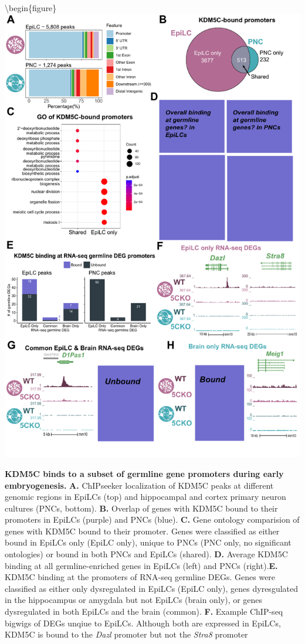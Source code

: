 \documentclass[
]{article}
\begin{document}
\textbackslash begin\{figure\} \centering 
\includegraphics{../submission/compiled_figs/KDM5C_ChIPseq.pdf}

\caption[KDM5C binds to a subset of germline gene promoters during early embryogenesis]{\textbf{KDM5C binds to a subset of germline gene promoters during early embryogenesis.} \textbf{A.} ChIPseeker localization of KDM5C peaks at different genomic regions in EpiLCs (top) and hippocampal and cortex primary neuron cultures (PNCs, bottom). \textbf{B.} Overlap of genes with KDM5C bound to their promoters in EpiLCs (purple) and PNCs (blue). \textbf{C.} Gene ontology comparision of genes with KDM5C bound to their promoter. Genes were classified as either bound in EpiLCs only (EpiLC only), unique to PNCs (PNC only, no significant ontologies) or bound in both PNCs and EpiLCs (shared). \textbf{D.} Average KDM5C binding at all germline-enriched genes in EpiLCs (left) and PNCs (right).\textbf{E.} KDM5C binding at the promoters of RNA-seq germline DEGs. Genes were classified as either only dysregulated in EpiLCs (EpiLC only), genes dyresgulated in the hippocampus or amygdala but not EpiLCs (brain only), or genes dysregulated in both EpiLCs and the brain (common). \textbf{F.} Example ChIP-seq bigwigs of DEGs unqiue to EpiLCs. Although both are expressed in EpiLCs, KDM5C is bound to the \textit{Dazl} promoter but not the \textit{Stra8} promoter}
\end{document}
